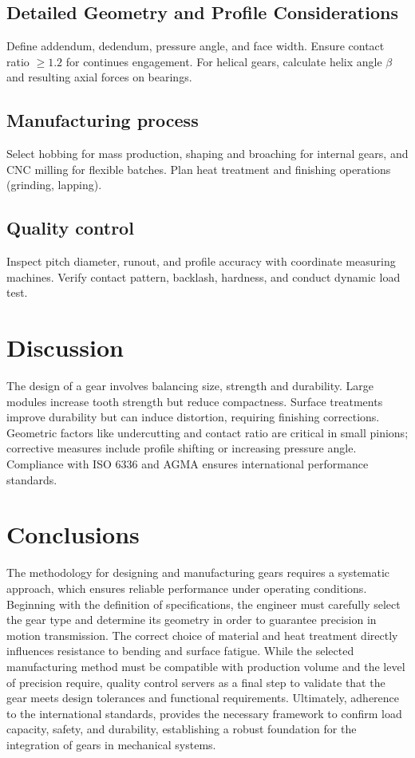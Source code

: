 \documentclass[11pt]{article}
\begin{document}
\subsection*{Detailed Geometry and Profile Considerations}

Define addendum, dedendum, pressure angle, and face width. Ensure contact ratio $\geq 1.2$ for continues engagement. For helical gears, calculate helix angle $\beta$ and resulting axial forces on bearings.

\subsection*{Manufacturing process}

Select hobbing for mass production, shaping and broaching for internal gears, and CNC milling for flexible batches. Plan heat treatment and finishing operations (grinding, lapping).

\subsection*{Quality control}

Inspect pitch diameter, runout, and profile accuracy with coordinate measuring machines. Verify contact pattern, backlash, hardness, and conduct dynamic load test.

\section*{Discussion}

The design of a gear involves balancing size, strength and durability. Large modules increase tooth strength but reduce compactness.
Surface treatments improve durability but can induce distortion, requiring finishing corrections.
Geometric factors like undercutting and contact ratio are critical in small pinions; corrective measures include profile shifting or increasing pressure angle.
Compliance with ISO 6336 and AGMA ensures international performance standards.

\section*{Conclusions}

The methodology for designing and manufacturing gears requires a systematic approach, which ensures reliable performance under operating conditions.
Beginning with the definition of specifications, the engineer must carefully select the gear type and determine its geometry in order to guarantee precision in motion transmission.
The correct choice of material and heat treatment directly influences resistance to bending and surface fatigue.
While the selected manufacturing method must be compatible with production volume and the level of precision require, quality control servers as a final step to validate that the gear meets design tolerances and functional requirements.
Ultimately, adherence to the international standards, provides the necessary framework to confirm load capacity, safety, and durability, establishing a robust foundation for the integration of gears in mechanical systems.
\end{document}
